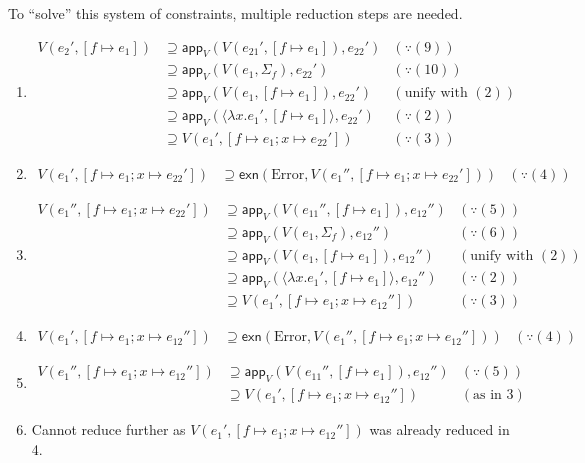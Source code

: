 \documentclass{article}
\begin{document}
To ``solve'' this system of constraints, multiple reduction steps are needed.

\begin{enumerate}
  \item
        \begin{align*}
          V(e_{2}',[f \mapsto e_{1}])
          &\supseteq \mathsf{app}_{V}(V(e_{21}',[f \mapsto e_{1}]),e_{22}') & (\because (9))\\
          &\supseteq \mathsf{app}_{V}(V(e_{1},\Sigma_{f}),e_{22}') & (\because (10))\\
          &\supseteq \mathsf{app}_{V}(V(e_{1},[f\mapsto e_{1}]),e_{22}') & (\text{unify with }(2))\\
          &\supseteq \mathsf{app}_{V}(\langle \lambda x. e_{1}',[f \mapsto e_{1}]\rangle , e_{22}') & (\because (2))\\
          &\supseteq V(e_{1}',[f\mapsto e_{1};x\mapsto e_{22}']) & (\because (3))
        \end{align*}
  \item
        \begin{align*}
          V(e_{1}',[f\mapsto e_{1};x\mapsto e_{22}'])
          &\supseteq \mathsf{exn}(\text{Error},V(e_{1}'',[f\mapsto e_{1};x\mapsto e_{22}'])) & (\because (4))
        \end{align*}
  \item
        \begin{align*}
          V(e_{1}'',[f\mapsto e_{1};x\mapsto e_{22}'])
          &\supseteq \mathsf{app}_{V}(V(e_{11}'',[f\mapsto e_{1}]),e_{12}'') & (\because (5))\\
          &\supseteq \mathsf{app}_{V}(V(e_{1},\Sigma_{f}),e_{12}'') & (\because (6))\\
          &\supseteq \mathsf{app}_{V}(V(e_{1},[f\mapsto e_{1}]),e_{12}'') & (\text{unify with }(2))\\
          &\supseteq \mathsf{app}_{V}(\langle \lambda x.e_{1}',[f\mapsto e_{1}]\rangle,e_{12}'') & (\because (2))\\
          &\supseteq V(e_{1}',[f \mapsto e_{1};x \mapsto e_{12}'']) & (\because (3))
        \end{align*}
  \item
        \begin{align*}
          V(e_{1}',[f \mapsto e_{1};x \mapsto e_{12}''])
          &\supseteq \mathsf{exn}(\text{Error},V(e_{1}'',[f\mapsto e_{1};x\mapsto e_{12}''])) & (\because (4))
        \end{align*}
  \item
        \begin{align*}
          V(e_{1}'',[f\mapsto e_{1};x\mapsto e_{12}''])
          &\supseteq \mathsf{app}_{V}(V(e_{11}'',[f\mapsto e_{1}]),e_{12}'') & (\because (5))\\
          &\supseteq V(e_{1}',[f\mapsto e_{1};x\mapsto e_{12}'']) & (\text{as in }3)
        \end{align*}
  \item Cannot reduce further as $V(e_{1}',[f \mapsto e_{1};x\mapsto e_{12}''])$ was already reduced in 4.
\end{enumerate}
\end{document}
